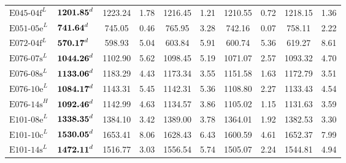 \begin{table}[ht]
\begin{tabular}{@{}llcccccccc@{}}
		$\text{E045-04f}^L$ & $\text{\textbf{1201.85}}^d$ & 1223.24                          & 1.78                       & 1216.45                     & 1.21                       & 1210.55          & 0.72         & 1218.15         & 1.36         \\
		$\text{E051-05e}^L$ & $\text{\textbf{741.64}}^d$  & 745.05                           & 0.46                       & 765.95                      & 3.28                       & 742.16           & 0.07         & 758.11          & 2.22         \\
		$\text{E072-04f}^L$ & $\text{\textbf{570.17}}^d$  & 598.93                           & 5.04                       & 603.84                      & 5.91                       & 600.74           & 5.36         & 619.27          & 8.61         \\
		$\text{E076-07s}^L$ & $\text{\textbf{1044.26}}^d$ & 1102.90                          & 5.62                       & 1098.45                     & 5.19                       & 1071.07          & 2.57         & 1093.32         & 4.70         \\
		$\text{E076-08s}^L$ & $\text{\textbf{1133.06}}^d$ & 1183.29                          & 4.43                       & 1173.34                     & 3.55                       & 1151.58          & 1.63         & 1172.79         & 3.51         \\
		$\text{E076-10e}^L$ & $\text{\textbf{1084.17}}^d$ & 1143.31                          & 5.45                       & 1142.31                     & 5.36                       & 1108.80          & 2.27         & 1133.43         & 4.54         \\
		$\text{E076-14s}^H$ & $\text{\textbf{1092.46}}^d$ & 1142.99                          & 4.63                       & 1134.57                     & 3.86                       & 1105.02          & 1.15         & 1131.63         & 3.59         \\
		$\text{E101-08e}^L$ & $\text{\textbf{1338.35}}^d$ & 1384.10                          & 3.42                       & 1389.00                     & 3.78                       & 1364.01          & 1.92         & 1382.53         & 3.30         \\
		$\text{E101-10c}^L$ & $\text{\textbf{1530.05}}^d$ & 1653.41                          & 8.06                       & 1628.43                     & 6.43                       & 1600.59          & 4.61         & 1652.37         & 7.99         \\
		$\text{E101-14s}^L$ & $\text{\textbf{1472.11}}^d$ & 1516.77                          & 3.03                       & 1556.54                     & 5.74                       & 1505.07          & 2.24         & 1544.81         & 4.94         \\\midrule

\end{tabular}
\end{table}

